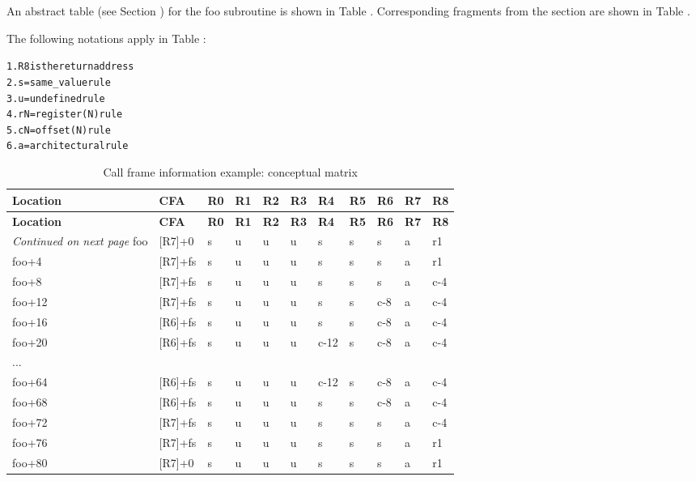 An abstract table 
(see Section ) 
for the foo subroutine is shown in 
Table .
Corresponding fragments from the
 section are shown in 
Table .

The following notations apply in 
Table :

\begin{alltt}
1. R8 is the return address
2. s = same\_value rule
3. u = undefined rule
4. rN = register(N) rule
5. cN = offset(N) rule
6. a = architectural rule
\end{alltt}

\begin{centering}
\setlength{\extrarowheight}{0.1cm}
\begin{longtable}{l|llllllllll}
  \caption{Call frame information example: conceptual matrix} 
  \label{tab:callframeinformationexampleconceptualmatrix} \\
  \hline \bfseries Location & \bfseries CFA & \bfseries R0 & \bfseries R1 & \bfseries R2 & \bfseries R3 & \bfseries R4 & \bfseries R5 & \bfseries R6 & \bfseries R7 & \bfseries R8 \\ \hline
\endfirsthead
  \bfseries Location &\bfseries CFA &\bfseries R0 & \bfseries R1 & \bfseries R2 &\bfseries R3 &\bfseries R4 &\bfseries R5 &\bfseries R6 &\bfseries R7 &\bfseries R8\\ \hline
\endhead
  \hline \emph{Continued on next page}
\endfoot
  \hline
\endlastfoot
foo&[R7]+0&s&u&u&u&s&s&s&a&r1 \\
foo+4&[R7]+fs&s&u&u&u&s&s&s&a&r1 \\
foo+8&[R7]+fs&s&u&u&u&s&s&s&a&c-4 \\
foo+12&[R7]+fs&s&u&u&u&s&s&c-8&a&c-4 \\
foo+16&[R6]+fs&s&u&u&u&s&s&c-8&a&c-4 \\
foo+20&[R6]+fs&s&u&u&u&c-12&s&c-8&a&c-4 \\
...&&&&&&&&&& \\
foo+64&[R6]+fs&s&u&u&u&c-12&s&c-8&a&c-4 \\
foo+68&[R6]+fs&s&u&u&u&s&s&c-8&a&c-4  \\
foo+72&[R7]+fs&s&u&u&u&s&s&s&a&c-4  \\
foo+76&[R7]+fs&s&u&u&u&s&s&s&a&r1 \\
foo+80&[R7]+0&s&u&u&u&s&s&s&a&r1 \\
\end{longtable}
\end{centering}

